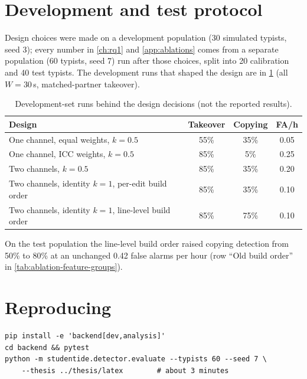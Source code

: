 \section{Development and test protocol}
Design choices were made on a development population (30 simulated
typists, seed 3); every number in \cref{ch:rq1} and \cref{app:ablations}
comes from a separate population (60 typists, seed 7) run after those
choices, split into 20 calibration and 40 test typists. The development
runs that shaped the design are in \cref{tab:dev-runs} (all $W=30$\,s,
matched-partner takeover).

\begin{table}[ht]
  \centering\small
  \caption{Development-set runs behind the design decisions (not the reported results).}
  \label{tab:dev-runs}
  \begin{tabular}{@{}lccc@{}}
    \toprule
    Design & Takeover & Copying & FA/h \\
    \midrule
    One channel, equal weights, $k=0.5$ & 55\% & 35\% & 0.05 \\
    One channel, ICC weights, $k=0.5$ & 85\% & 5\% & 0.25 \\
    Two channels, $k=0.5$ & 85\% & 35\% & 0.20 \\
    Two channels, identity $k=1$, per-edit build order & 85\% & 35\% & 0.10 \\
    Two channels, identity $k=1$, line-level build order & 85\% & 75\% & 0.10 \\
    \bottomrule
  \end{tabular}
\end{table}

On the test population the line-level build order raised copying
detection from 50\% to 80\% at an unchanged 0.42 false alarms per hour
(row ``Old build order'' in \cref{tab:ablation-feature-groups}).

\section{Reproducing}
\begin{lstlisting}
pip install -e 'backend[dev,analysis]'
cd backend && pytest
python -m studentide.detector.evaluate --typists 60 --seed 7 \
    --thesis ../thesis/latex        # about 3 minutes
\end{lstlisting}
